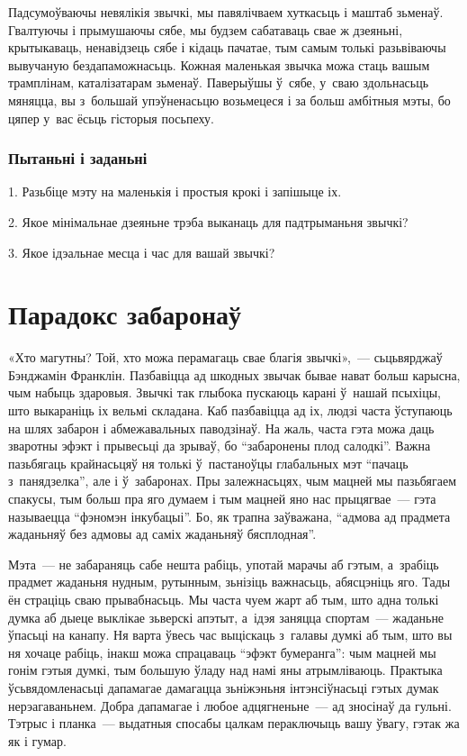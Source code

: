 Падсумоўваючы невялікія звычкі, мы павялічваем хуткасьць і маштаб зьменаў. Гвалтуючы і прымушаючы сябе, мы будзем сабатаваць свае ж дзеяньні, крытыкаваць, ненавідзець сябе і кідаць пачатае, тым самым толькі разьвіваючы вывучаную бездапаможнасьць. Кожная маленькая звычка можа стаць вашым трамплінам, каталізатарам зьменаў. Паверыўшы ў~сябе, у~сваю здольнасьць мяняцца, вы з~большай упэўненасьцю возьмецеся і за больш амбітныя мэты, бо цяпер у~вас ёсьць гісторыя посьпеху.

\subsubsection{Пытаньні і заданьні}

1. Разьбіце мэту на маленькія і простыя крокі і запішыце іх.

2. Якое мінімальнае дзеяньне трэба выканаць для падтрыманьня звычкі?

3. Якое ідэальнае месца і час для вашай звычкі?


\section{Парадокс забаронаў}

«Хто магутны? Той, хто можа перамагаць свае благія звычкі»,~--- сьцьвярджаў Бэнджамін Франклін. Пазбавіцца ад шкодных звычак бывае нават больш карысна, чым набыць здаровыя. Звычкі так глыбока пускаюць карані ў~нашай псыхіцы, што выкараніць іх вельмі складана. Каб пазбавіцца ад іх, людзі часта ўступаюць на шлях забарон і абмежавальных паводзінаў. На жаль, часта гэта можа даць зваротны эфэкт і прывесьці да зрываў, бо ``забаронены плод салодкі''. Важна пазьбягаць крайнасьцяў ня толькі ў~пастаноўцы глабальных мэт ``пачаць з~панядзелка'', але і ў~забаронах. Пры залежнасьцях, чым мацней мы пазьбягаем спакусы, тым больш пра яго думаем і тым мацней яно нас прыцягвае~--- гэта называецца ``фэномэн інкубацыі''. Бо, як трапна заўважана, ``адмова ад прадмета жаданьняў без адмовы ад саміх жаданьняў бясплодная''. 

Мэта~--- не забараняць сабе нешта рабіць, употай марачы аб гэтым, а~зрабіць прадмет жаданьня нудным, рутынным, зьнізіць важнасьць, абясцэніць яго. Тады ён страціць сваю прывабнасьць. Мы часта чуем жарт аб тым, што адна толькі думка аб дыеце выклікае зьверскі апэтыт, а~ідэя заняцца спортам~--- жаданьне ўпасьці на канапу. Ня варта ўвесь час выціскаць з~галавы думкі аб тым, што вы ня хочаце рабіць, інакш можа спрацаваць ``эфэкт бумеранга'': чым мацней мы гонім гэтыя думкі, тым большую ўладу над намі яны атрымліваюць. Практыка ўсьвядомленасьці дапамагае дамагацца зьніжэньня інтэнсіўнасьці гэтых думак нерэагаваньнем. Добра дапамагае і любое адцягненьне~--- ад зносінаў да гульні. Тэтрыс і планка~--- выдатныя спосабы цалкам пераключыць вашу ўвагу, гэтак жа як і гумар.

